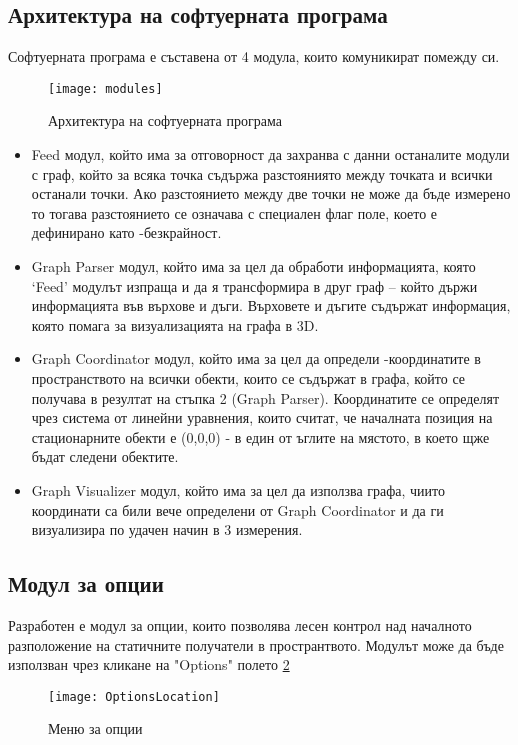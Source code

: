 \subsection{Архитектура на софтуерната програма}
Софтуерната програма е съставена от 4 модула, които комуникират помежду си.

\begin{figure}
    \texttt{[image: modules]}
    \caption{Архитектура на софтуерната програма}
    \label{fig:architecture}
\end{figure}

\begin{itemize}
    \item Feed  модул, който има за отговорност да захранва с данни останалите модули с граф, който за всяка точка съдържа разстояниято между точката и всички останали точки. Ако разстоянието между две точки не може да бъде измерено то тогава разстоянието се означава с специален флаг поле, което е дефинирано като -безкрайност.
    \item Graph Parser модул, който има за цел да обработи информацията, която ‘Feed’ модулът изпраща и да я трансформира в друг граф – който държи информацията във върхове и дъги. Върховете и 
    дъгите съдържат информация, която помага за визуализацията на графа в 3D.
    \item Graph Coordinator модул, който има за цел да определи -координатите в пространството на всички обекти, които се съдържат в графа, който се получава в резултат на стъпка 2 (Graph Parser). Координатите се определят чрез система от линейни уравнения, които считат, че началната позиция на стационарните обекти е (0,0,0) - в един от ъглите на мястото, в което щже бъдат следени обектите.
    \item Graph Visualizer модул, който има за цел да използва графа, чиито координати са били вече определени от Graph Coordinator и да ги визуализира по удачен начин в 3 измерения.
\end{itemize}

\pagebreak

\subsection{Модул за опции}
Разработен е модул за опции, които позволява лесен контрол над началното разположение на статичните получатели в пространтвото. Модулът може да бъде използван чрез кликане на "Options" полето \ref{fig:options}

\begin{figure}
   \texttt{[image: OptionsLocation]}
    \caption{Меню за опции}
    \label{fig:options}
\end{figure}

